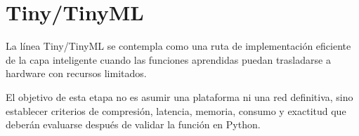 \section{Tiny/TinyML}

La línea Tiny/TinyML se contempla como una ruta de implementación eficiente de la capa inteligente cuando las funciones aprendidas puedan trasladarse a hardware con recursos limitados.

El objetivo de esta etapa no es asumir una plataforma ni una red definitiva, sino establecer criterios de compresión, latencia, memoria, consumo y exactitud que deberán evaluarse después de validar la función en Python.

